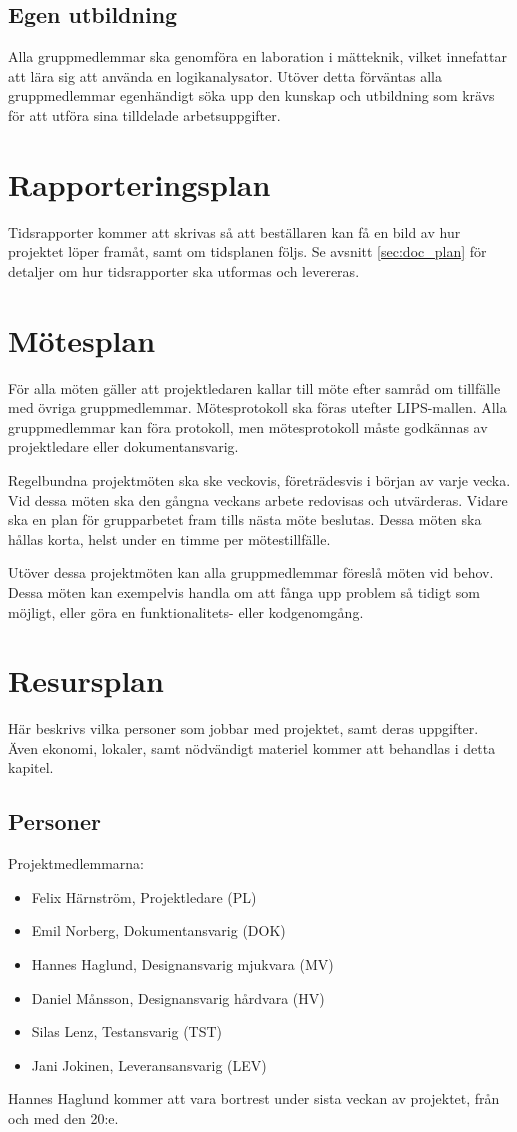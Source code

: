 \documentclass[a4paper,11pt]{article}
\begin{document}
\subsection{Egen utbildning}
Alla gruppmedlemmar ska genomföra en laboration i mätteknik, vilket innefattar att lära sig att använda en logikanalysator. Utöver detta förväntas alla gruppmedlemmar egenhändigt söka upp den kunskap och utbildning som krävs för att utföra sina tilldelade arbetsuppgifter.

\section{Rapporteringsplan}
Tidsrapporter kommer att skrivas så att beställaren kan få en bild av hur projektet löper framåt, samt om tidsplanen följs. Se avsnitt \ref{sec:doc_plan} för detaljer om hur tidsrapporter ska utformas och levereras.

\section{Mötesplan}
För alla möten gäller att projektledaren kallar till möte efter samråd om tillfälle med övriga gruppmedlemmar. Mötesprotokoll ska föras utefter LIPS-mallen. Alla gruppmedlemmar kan föra protokoll, men mötesprotokoll måste godkännas av projektledare eller dokumentansvarig.

Regelbundna projektmöten ska ske veckovis, företrädesvis i början av varje vecka. Vid dessa möten ska den gångna veckans arbete redovisas och utvärderas. Vidare ska en plan för grupparbetet fram tills nästa möte beslutas. Dessa möten ska hållas korta, helst under en timme per mötestillfälle. 

Utöver dessa projektmöten kan alla gruppmedlemmar föreslå möten vid behov. Dessa möten kan exempelvis handla om att fånga upp problem så tidigt som möjligt, eller göra en funktionalitets- eller kodgenomgång.

\section{Resursplan}
Här beskrivs vilka personer som jobbar med projektet, samt deras uppgifter. Även ekonomi, lokaler, samt nödvändigt materiel kommer att behandlas i detta kapitel.

\subsection{Personer}
Projektmedlemmarna:
\begin{itemize}
	\item Felix Härnström, Projektledare (PL)
	\item Emil Norberg, Dokumentansvarig (DOK)
	\item Hannes Haglund, Designansvarig mjukvara (MV)
	\item Daniel Månsson, Designansvarig hårdvara (HV)
	\item Silas Lenz, Testansvarig (TST)
	\item Jani Jokinen, Leveransansvarig (LEV)
\end{itemize}
Hannes Haglund kommer att vara bortrest under sista veckan av projektet, från och med den 20:e.
\end{document}
